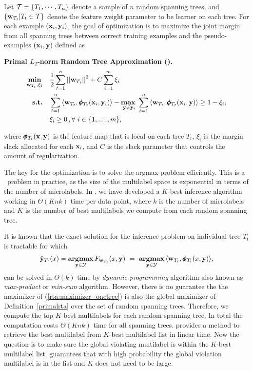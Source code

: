 {Let $\mathcal{T}=\{T_1,\cdots,T_n\}$ denote a sample of $n$ random spanning trees, and $\{\mathbf {w}_{T_t}|T_t\in\mathcal{T}\}$ denote the feature weight parameter to be learner on each tree.
For each example $(\mathbf {x}_i,\mathbf {y}_i)$, the goal of optimization is to maximize the joint margin from all spanning trees between correct training examples and the pseudo-examples $(\mathbf {x}_i,\mathbf {y})$ defined as
\begin{definition}{\bf Primal $L_2$-norm Random Tree Approximation (\rta).}\label{primalrta}
	\begin{align*}
		\underset{\vw_{T_t},\xi_i}{\minimize} & \quad \frac{1}{2}\sum_{t=1}^{n}\norm{\vw_{T_t}}^2 + C\sum_{i=1}^{m}\xi_i\\
		\st & \quad \sum_{t=1}^{n}{ \langle \vw_{T_t}, \phib_{T_t}(\vx_i,\vy_i) \rangle} - \underset{\vy \neq \vy_i}{\maximize\ } \sum_{t=1}^{n}{\langle \vw_{T_t}, \phib_{T_t}(\vx_i,\vy) \rangle } \geq 1 -  \xi_i, \\
		& \quad \xi_i\ge0\, , \forall\ i \in \set{1,\dots,m},
	\end{align*}
\end{definition}
where $\pmb \phi_{T_t}(\mathbf {x},\mathbf {y})$ is the feature map that is local on each tree $T_t$, $\xi_i$ is the margin slack allocated for each $\mathbf {x}_i$, and $C$ is the slack parameter that controls the amount of regularization.

The key for the optimization is to solve the argmax problem efficiently.
This is a \nphard\ problem in practice, as the size of the multilabel space is exponential in terms of the number of microlabels.
In , we have developed a $K$-best inference algorithm working in $\Theta(Knk)$ time per data point, where $k$ is the number of microlabels and $K$ is the number of best multilabels we compute from each random spanning tree.

It is known that the exact solution for the inference problem on individual tree $T_t$ is tractable \citep{Koller09probabilistic} for which 
\begin{align}
	\hat{\mathbf {y}}_{T_t}(x) = \underset{\mathbf {y}\in\mathcal{Y}}{\textbf{argmax}}\, F_{\mathbf {w}_{T_t}}(x,\mathbf {y})\ =\ \underset{\mathbf {y}\in\mathcal{Y}}{\textbf{argmax}}\, \langle \mathbf {w}_{T_t}, \pmb \phi_{T_t}(x,\mathbf {y})\rangle, \label{rta:maximizer_onetree}
\end{align}
can be solved in $\Theta(k)$ time by \textit{dynamic programming} algorithm also known as \textit{max-product} or \textit{min-sum} algorithm.
However, there is no guarantee the the maximizer of (\ref{rta:maximizer_onetree}) is also the global maximizer of Definition~\ref{primalrta} over the set of random spanning trees.
Therefore, we compute the top $K$-best multilabels for each random spanning tree.
In total the computation costs $\Theta(Knk)$ time for all spanning trees.
 provides a method to retrieve the best multilabel from $K$-best multilabel list in linear time.
Now the question is to make sure the global violating multilabel is within the $K$-best multilabel list.
 guarantees that with high probability the global violation multilabel is in the list and $K$ does not need to be large.

}
